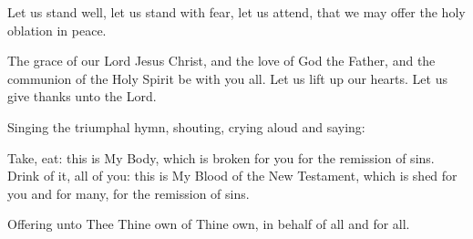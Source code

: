 \begin{liturgicaltext}
    \priest Let us stand well, let us stand with fear, let us attend, that we may offer the holy oblation in peace.
    \choir
\end{liturgicaltext}
\begin{liturgicaltext}
    \priest The grace of our Lord Jesus Christ, and the love of God the Father, and the communion of the Holy Spirit be with you all.
    \choir {}
    \priest Let us lift up our hearts.
    \choir {}
    \priest Let us give thanks unto the Lord.
    \choir
\end{liturgicaltext}
\begin{liturgicaltext}
    \priest Singing the triumphal hymn, shouting, crying aloud and saying:
    \choir
\end{liturgicaltext}
\begin{liturgicaltext}
    \priest Take, eat: this is My Body, which is broken for you for the remission of sins. 
    \choir {}
    \priest Drink of it, all of you: this is My Blood of the New Testament, which is shed for you and for many, for the remission of sins. 
    \choir
\end{liturgicaltext}
\begin{liturgicaltext}
    \priest Offering unto Thee Thine own of Thine own, in behalf of all and for all.
    \choir
\end{liturgicaltext}
